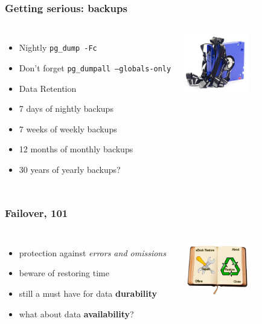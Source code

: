 \documentclass[english]{beamer}
\begin{document}
\begin{frame}[fragile]
  \frametitle{Getting serious: backups}


\begin{columns}[c]

  \begin{itemize}
   \item<1-> Nightly \texttt{pg\_dump -Fc}
   \item<1-> Don't forget \texttt{pg\_dumpall --globals-only}
   \item<2-> Data Retention
   \item<2-> 7 days of nightly backups
   \item<2-> 7 weeks of weekly backups
   \item<2-> 12 months of monthly backups
   \item<3-> 30 years of yearly backups?
  \end{itemize}  

\includegraphics[height=7em]{online-backup.jpg}
\end{columns}
\end{frame}

\begin{frame}[fragile]
  \frametitle{Failover, 101}

  \linebreak
  \linebreak

\begin{columns}[c]

  \begin{itemize}
    \item<1-> protection against \textit{errors and omissions}
    \item<1-> beware of restoring time
    \item<2-> still a must have for data \textbf{durability}
    \item<2-> what about data \textbf{availability}?
  \end{itemize}

\includegraphics[height=7em]{restore.png}
\end{columns}
\end{frame}
\end{document}
